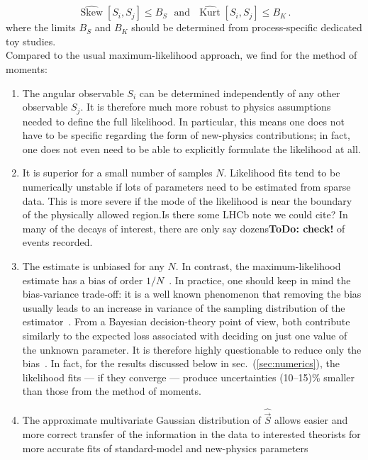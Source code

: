 \documentclass[aps,prd,reprint,nofootinbib,preprintnumbers]{revtex4}
\newcommand{\est}[1]{\widehat{#1}}
\newcommand{\refsec}[1]{sec.~(\ref{sec:#1})}
\newcommand{\vecest}[1]{\widehat{\vec{#1}}}
\DeclareMathOperator{\kurt}{Kurt}
\newcommand{\todo}[1]{{\color{red}\bf ToDo: #1}}
\newcommand{\fred}[1]{{\color{brown!85!black}#1}}
\begin{document}
\begin{equation}
    \est{\operatorname{Skew}}[S_i,S_j] \leq B_S\,\,\text{ and }\,\,\est{\kurt}[S_i,S_j] \leq B_K\,.
\end{equation}
where the limits $B_S$ and $B_K$ should be determined from process-specific dedicated toy studies.\\

Compared to the usual maximum-likelihood approach, we find for the method of moments:
\begin{enumerate}
  \item The angular observable ${S_i}$ can be determined
  independently of any other observable ${S_j}$. It is therefore
  much more robust to physics assumptions needed to define the full
  likelihood. In particular, this means one does not have to be
  specific regarding the form of new-physics contributions; in fact,
  one does not even need to be able to explicitly formulate the
  likelihood at all.
\item It is superior for a small number of samples $N$. Likelihood
  fits tend to be numerically unstable if lots of parameters need to
  be estimated from sparse data. This is more severe if the mode of
  the likelihood is near the boundary of the physically allowed
  region.\fred{Is there some LHCb note we could cite?} In many of the
  decays of interest, there are only say dozens\todo{check!} of events recorded.
\item The estimate is unbiased for any $N$. In contrast, the
  maximum-likelihood estimate has a bias of order
  $1/N$~\cite{Cox:1968}. In practice, one should keep in mind the
  bias-variance trade-off: it is a well known phenomenon that removing
  the bias usually leads to an increase in variance of the sampling
  distribution of the estimator~\cite[sec. 7.3]{James:2006zz}. From a
  Bayesian decision-theory point of view, both contribute similarly to
  the expected loss associated with deciding on just one value of the
  unknown parameter. It is therefore highly questionable to reduce
  only the bias~\cite[sections 13.8,17.2]{jaynes:2003}. In fact, for
  the results discussed below in \refsec{numerics}, the likelihood
  fits --- if they converge --- produce uncertainties (10--15)\%
  smaller than those from the method of moments.
  \item The approximate multivariate Gaussian distribution of $\vecest{S}$
  allows easier and more correct transfer of the information in the
  data to interested theorists for more accurate fits of
  standard-model and new-physics parameters \cite{Altmannshofer:2013foa,
}
\end{enumerate}
\end{document}
